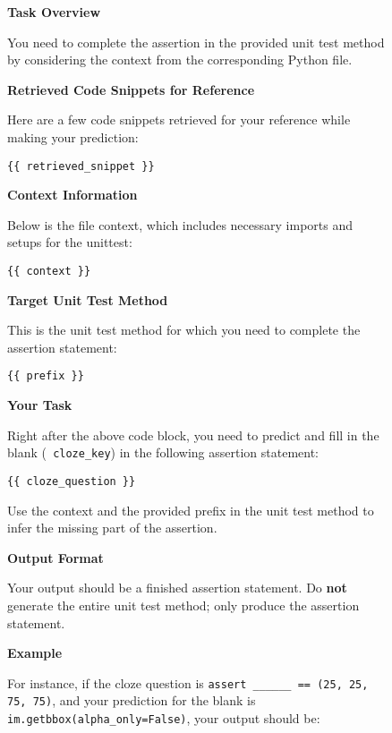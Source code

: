 



\begin{figure}[t]
    \centering

\begin{tcolorbox}[colback=blue!5!white, colframe=blue!75!black,title=Task I (Contextual)]

\textbf{Task Overview}

You need to complete the assertion in the provided unit test method by considering the context from the corresponding Python file.

\textbf{Retrieved Code Snippets for Reference}

Here are a few code snippets retrieved for your reference while making your prediction:

\begin{verbatim}
{{ retrieved_snippet }}
\end{verbatim}

\textbf{Context Information}

Below is the file context, which includes necessary imports and setups for the unittest:
\begin{verbatim}
{{ context }}
\end{verbatim}

\textbf{Target Unit Test Method}

This is the unit test method for which you need to complete the assertion statement:
\begin{verbatim}
{{ prefix }}
\end{verbatim}

\textbf{Your Task}

Right after the above code block, you need to predict and fill in the blank (\texttt{{ cloze\_key}}) in the following assertion statement:
\begin{verbatim}
{{ cloze_question }}
\end{verbatim}
Use the context and the provided prefix in the unit test method to infer the missing part of the assertion.

\textbf{Output Format}

Your output should be a finished assertion statement. Do \textbf{not} generate the entire unit test method; only produce the assertion statement.

\textbf{Example}

For instance, if the cloze question is \texttt{assert \_\_\_\_\_\_ == (25, 25, 75, 75)}, and your prediction for the blank is \texttt{im.getbbox(alpha\_only=False)}, your output should be:


\end{tcolorbox}
\end{figure}
